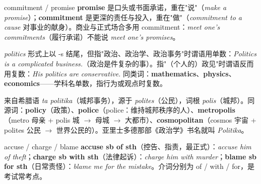 \documentclass[../main.tex]{subfiles}
\begin{document}

\begin{lex}{commitment / promise}
\textbf{promise} 是口头或书面承诺，重在"说"（\textit{make a promise}）；\textbf{commitment} 是更深的责任与投入，重在"做"（\textit{commitment to a cause} 对事业的献身）。商业与正式场合多用 commitment：\textit{meet one's commitments}（履行承诺）不能说 \textit{meet one's promises}。
\end{lex}




\begin{gram}
\textit{politics} 形式上以 -s 结尾，但指"政治、政治学、政治事务"时谓语用单数：\textit{Politics is a complicated business.}（政治是件复杂的事）。指"（个人的）政见"时谓语反而用复数：\textit{His politics are conservative.} 同类词：\textbf{mathematics}、\textbf{physics}、\textbf{economics}——学科名单数，指行为或观点时复数。
\end{gram}

\begin{origin}
来自希腊语 \textit{ta politika}（城邦事务），源于 \textit{polites}（公民），词根 \textit{polis}（城邦）。同源词：\textbf{policy}（政策）、\textbf{police}（police：维持城邦秩序的人）、\textbf{metropolis}（metro 母亲 + polis 城 $\to$ 母城 $\to$ 大都市）、\textbf{cosmopolitan}（cosmos 宇宙 + polites 公民 $\to$ 世界公民的）。亚里士多德那部《政治学》书名就叫 \textit{Politika}。
\end{origin}



\begin{lex}{accuse / charge / blame}
\textbf{accuse sb of sth}（控告、指责，最正式）：\textit{accuse him of theft}；\textbf{charge sb with sth}（法律起诉）：\textit{charge him with murder}；\textbf{blame sb for sth}（日常责怪）：\textit{blame me for the mistake}。介词分别为 of / with / for，是考试常考点。
\end{lex}
\end{document}
